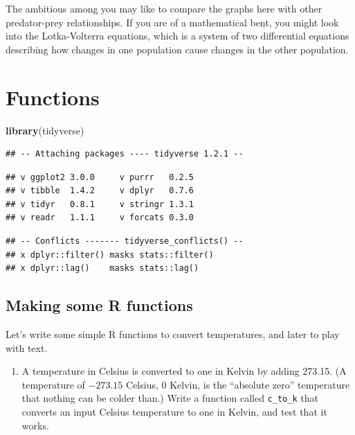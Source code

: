 \documentclass[]{tufte-book}
\newenvironment{Shaded}{}{}
\newcommand{\KeywordTok}[1]{\textcolor[rgb]{0.00,0.44,0.13}{\textbf{#1}}}
\newcommand{\NormalTok}[1]{#1}
\providecommand{\tightlist}{%
  \setlength{\itemsep}{0pt}\setlength{\parskip}{0pt}}
\theoremstyle{definition}
\theoremstyle{definition}
\theoremstyle{definition}
\theoremstyle{remark}
\begin{document}
The ambitious among you may like to compare the graphs here with other
predator-prey relationships. If you are of a mathematical bent, you
might look into the Lotka-Volterra equations, which is a system of two
differential equations describing how changes in one population cause
changes in the other population.

\hypertarget{functions}{%
\chapter{Functions}\label{functions}}

\begin{Shaded}
\begin{Highlighting}[]
\KeywordTok{library}\NormalTok{(tidyverse)}
\end{Highlighting}
\end{Shaded}

\begin{verbatim}
## -- Attaching packages ---- tidyverse 1.2.1 --
\end{verbatim}

\begin{verbatim}
## v ggplot2 3.0.0     v purrr   0.2.5
## v tibble  1.4.2     v dplyr   0.7.6
## v tidyr   0.8.1     v stringr 1.3.1
## v readr   1.1.1     v forcats 0.3.0
\end{verbatim}

\begin{verbatim}
## -- Conflicts ------- tidyverse_conflicts() --
## x dplyr::filter() masks stats::filter()
## x dplyr::lag()    masks stats::lag()
\end{verbatim}

\hypertarget{making-some-r-functions}{%
\section{Making some R functions}\label{making-some-r-functions}}

Let's write some simple R functions to convert temperatures, and later
to play with text.

\begin{enumerate}
\def\labelenumi{(\alph{enumi})}
\tightlist
\item
  A temperature in Celsius is converted to one in Kelvin by adding
  273.15. (A temperature of \(-273.15\) Celsius, 0 Kelvin, is the
  ``absolute zero'' temperature that nothing can be colder than.) Write
  a function called \texttt{c\_to\_k} that converts an input Celsius
  temperature to one in Kelvin, and test that it works.
\end{enumerate}
\end{document}
